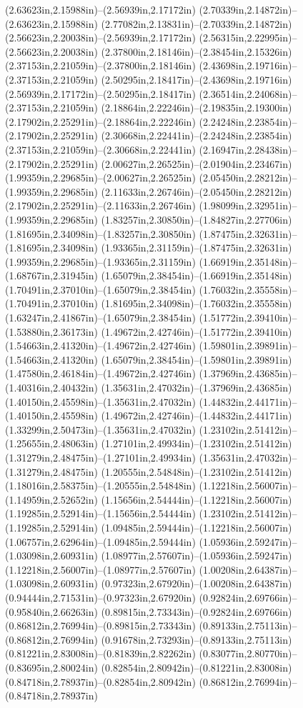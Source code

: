 (2.63623in,2.15988in)--(2.56939in,2.17172in) (2.70339in,2.14872in)--(2.63623in,2.15988in) (2.77082in,2.13831in)--(2.70339in,2.14872in) (2.56623in,2.20038in)--(2.56939in,2.17172in) (2.56315in,2.22995in)--(2.56623in,2.20038in) (2.37800in,2.18146in)--(2.38454in,2.15326in) (2.37153in,2.21059in)--(2.37800in,2.18146in) (2.43698in,2.19716in)--(2.37153in,2.21059in) (2.50295in,2.18417in)--(2.43698in,2.19716in) (2.56939in,2.17172in)--(2.50295in,2.18417in) (2.36514in,2.24068in)--(2.37153in,2.21059in) (2.18864in,2.22246in)--(2.19835in,2.19300in) (2.17902in,2.25291in)--(2.18864in,2.22246in) (2.24248in,2.23854in)--(2.17902in,2.25291in) (2.30668in,2.22441in)--(2.24248in,2.23854in) (2.37153in,2.21059in)--(2.30668in,2.22441in) (2.16947in,2.28438in)--(2.17902in,2.25291in) (2.00627in,2.26525in)--(2.01904in,2.23467in) (1.99359in,2.29685in)--(2.00627in,2.26525in) (2.05450in,2.28212in)--(1.99359in,2.29685in) (2.11633in,2.26746in)--(2.05450in,2.28212in) (2.17902in,2.25291in)--(2.11633in,2.26746in) (1.98099in,2.32951in)--(1.99359in,2.29685in) (1.83257in,2.30850in)--(1.84827in,2.27706in) (1.81695in,2.34098in)--(1.83257in,2.30850in) (1.87475in,2.32631in)--(1.81695in,2.34098in) (1.93365in,2.31159in)--(1.87475in,2.32631in) (1.99359in,2.29685in)--(1.93365in,2.31159in) (1.66919in,2.35148in)--(1.68767in,2.31945in) (1.65079in,2.38454in)--(1.66919in,2.35148in) (1.70491in,2.37010in)--(1.65079in,2.38454in) (1.76032in,2.35558in)--(1.70491in,2.37010in) (1.81695in,2.34098in)--(1.76032in,2.35558in) (1.63247in,2.41867in)--(1.65079in,2.38454in) (1.51772in,2.39410in)--(1.53880in,2.36173in) (1.49672in,2.42746in)--(1.51772in,2.39410in) (1.54663in,2.41320in)--(1.49672in,2.42746in) (1.59801in,2.39891in)--(1.54663in,2.41320in) (1.65079in,2.38454in)--(1.59801in,2.39891in) (1.47580in,2.46184in)--(1.49672in,2.42746in) (1.37969in,2.43685in)--(1.40316in,2.40432in) (1.35631in,2.47032in)--(1.37969in,2.43685in) (1.40150in,2.45598in)--(1.35631in,2.47032in) (1.44832in,2.44171in)--(1.40150in,2.45598in) (1.49672in,2.42746in)--(1.44832in,2.44171in) (1.33299in,2.50473in)--(1.35631in,2.47032in) (1.23102in,2.51412in)--(1.25655in,2.48063in) (1.27101in,2.49934in)--(1.23102in,2.51412in) (1.31279in,2.48475in)--(1.27101in,2.49934in) (1.35631in,2.47032in)--(1.31279in,2.48475in) (1.20555in,2.54848in)--(1.23102in,2.51412in) (1.18016in,2.58375in)--(1.20555in,2.54848in) (1.12218in,2.56007in)--(1.14959in,2.52652in) (1.15656in,2.54444in)--(1.12218in,2.56007in) (1.19285in,2.52914in)--(1.15656in,2.54444in) (1.23102in,2.51412in)--(1.19285in,2.52914in) (1.09485in,2.59444in)--(1.12218in,2.56007in) (1.06757in,2.62964in)--(1.09485in,2.59444in) (1.05936in,2.59247in)--(1.03098in,2.60931in) (1.08977in,2.57607in)--(1.05936in,2.59247in) (1.12218in,2.56007in)--(1.08977in,2.57607in) (1.00208in,2.64387in)--(1.03098in,2.60931in) (0.97323in,2.67920in)--(1.00208in,2.64387in) (0.94444in,2.71531in)--(0.97323in,2.67920in) (0.92824in,2.69766in)--(0.95840in,2.66263in) (0.89815in,2.73343in)--(0.92824in,2.69766in) (0.86812in,2.76994in)--(0.89815in,2.73343in) (0.89133in,2.75113in)--(0.86812in,2.76994in) (0.91678in,2.73293in)--(0.89133in,2.75113in) (0.81221in,2.83008in)--(0.81839in,2.82262in) (0.83077in,2.80770in)--(0.83695in,2.80024in) (0.82854in,2.80942in)--(0.81221in,2.83008in) (0.84718in,2.78937in)--(0.82854in,2.80942in) (0.86812in,2.76994in)--(0.84718in,2.78937in) 